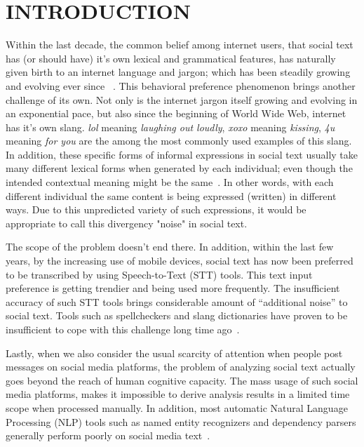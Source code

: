 \documentclass[a4paper,onesided,12pt]{report}
\begin{document}
\begin{abbreviations}
\end{abbreviations}


\chapter{INTRODUCTION}
\label{chapter:introduction}
Within the last decade, the common belief among internet users, that social text has (or should have) it's own lexical and grammatical features, has naturally given birth to an internet language and jargon; which has been steadily growing and evolving ever since ~\cite{Choudhury:2007:IMS:1326044.1326048, eisenstein2013bad}. This behavioral preference phenomenon brings another challenge of its own. Not only is the internet jargon itself growing and evolving in an exponential pace, but also since the beginning of World Wide Web, internet has it's own slang. \textit{lol} meaning \textit{laughing out loudly},  \textit{xoxo} meaning \textit{kissing}, \textit{4u} meaning \textit{for you} are the among the most commonly used examples of this slang. In addition, these specific forms of informal expressions in social text usually take many different lexical forms when generated by each individual; even though the intended contextual meaning might be the same~\cite{eisenstein2013bad}. In other words, with each different individual the same content is being expressed (written) in different ways. Due to this unpredicted variety of such expressions, it would be appropriate to call this divergency "noise" in social text.

The scope of the problem doesn't end there. In addition, within the last few years, by the increasing use of mobile devices, social text has now been preferred to be transcribed by using Speech-to-Text (STT) tools. This text input preference is getting trendier and being used more frequently. The insufficient accuracy of such STT tools brings considerable amount of ``additional noise'' to social text. Tools such as spellcheckers and slang dictionaries have proven to be insufficient to cope with this challenge long time ago~\cite{sproat2001normalization}.

Lastly, when we also consider the usual scarcity of attention when people post messages on social media platforms, the problem of analyzing social text actually goes beyond the reach of human cognitive capacity. The mass usage of such social media platforms, makes it impossible to derive analysis results in a limited time scope when processed manually. In addition, most automatic Natural Language Processing (NLP) tools such as named entity recognizers and  dependency parsers generally perform poorly on social media text~\cite{ritter2010unsupervised}.
\end{document}
